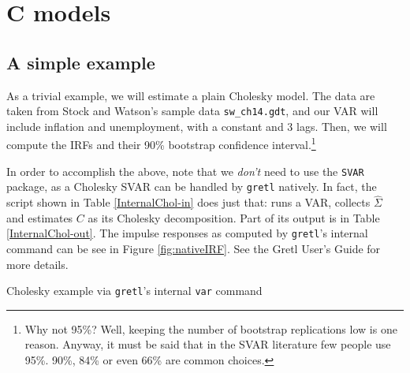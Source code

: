 \documentclass[a4paper,10pt]{article}
\newcounter{script}[section]
\begin{document}
\section{C models}
\label{sec:Cmodel}
\subsection{A simple example}

As a trivial example, we will estimate a plain Cholesky model. The
data are taken from Stock and Watson's sample data
\texttt{sw\_ch14.gdt}, and our VAR will include inflation and
unemployment, with a constant and 3 lags. Then, we will compute the
IRFs and their 90\% bootstrap confidence interval.\footnote{Why not
  95\%? Well, keeping the number of bootstrap replications low is one
  reason. Anyway, it must be said that in the SVAR literature few
  people use 95\%. 90\%, 84\% or even 66\% are common choices.}
  
In order to accomplish the above, note that we \emph{don't} need to
use the \texttt{SVAR} package, as a Cholesky SVAR can be handled by
\texttt{gretl} natively. In fact, the script shown in Table
\ref{InternalChol-in} does just that: runs a VAR, collects
$\hat{\Sigma}$ and estimates $C$ as its Cholesky decomposition. 
Part of its output is in Table \ref{InternalChol-out}.  The impulse
responses as computed by \texttt{gretl}'s internal command can be see
in Figure \ref{fig:nativeIRF}. See the Gretl User's Guide for more
details.  
  
\begin{table}[htbp]
  \caption{Cholesky example via \texttt{gretl}'s internal 
  \texttt{var} command}
   \label{InternalChol-in}
\end{table}
\end{document}
